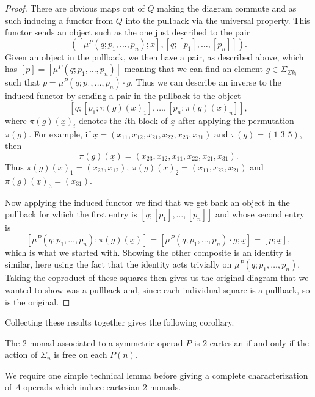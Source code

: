 \begin{proof}
There are obvious maps out of $Q$ making the diagram commute and as such inducing a functor from $Q$ into the pullback via the universal property. This functor sends an object such as the one just described to the pair
    \[
        \left(\left[\mu^P(q;p_1,\ldots,p_n);\underline{x}\right], [q;[p_1],\ldots,[p_n]]\right).
    \]
Given an object in the pullback, we then have a pair, as described above, which has $[p] = [\mu^P(q;p_1,\ldots,p_n)]$ meaning that we can find an element $g \in \Sigma_{\Sigma k_i}$ such that $p  = \mu^P(q;p_1,\ldots,p_n) \cdot g$. Thus we can describe an inverse to the induced functor by sending a pair in the pullback to the object
    \[
        [q;[p_1;\pi(g)(\underline{x})_1],\ldots,[p_n;\pi(g)(\underline{x})_n]],
    \]
where $\pi(g)(\underline{x})_i$ denotes the $i$th block of $\underline{x}$ after applying the permutation $\pi(g)$. For example, if $\underline{x} = (x_{11}, x_{12}, x_{21}, x_{22}, x_{23}, x_{31})$ and $\pi(g) = (1\, \, 3 \, \, 5)$, then
    \[
        \pi(g)(\underline{x}) = (x_{23}, x_{12}, x_{11}, x_{22}, x_{21}, x_{31}).
    \]
Thus $\pi(g)(\underline{x})_1 = (x_{23}, x_{12})$, $\pi(g)(\underline{x})_2 = (x_{11}, x_{22}, x_{21})$ and $\pi(g)(\underline{x})_3 = (x_{31})$.

Now applying the induced functor we find that we get back an object in the pullback for which the first entry is $[q;[p_1],\ldots,[p_n]]$ and whose second entry is
    \[
       \left[\mu^P(q;p_1,\ldots,p_n);\pi(g)(\underline{x})\right] = \left[\mu^P(q;p_1,\ldots,p_n) \cdot g;\underline{x}\right] = [p;\underline{x}],
    \]
which is what we started with. Showing the other composite is an identity is similar, here using the fact that the identity acts trivially on $\mu^P(q;p_1,\ldots,p_n)$. Taking the coproduct of these squares then gives us the original diagram that we wanted to show was a pullback and, since each individual square is a pullback, so is the original.
\end{proof}

Collecting these results together gives the following corollary.

\begin{cor}\label{cart_cor}
The $2$-monad associated to a symmetric operad $P$ is $2$-cartesian if and only if the action of $\Sigma_n$ is free on each $P(n)$.
\end{cor}

We require one simple technical lemma before giving a complete characterization of $\Lambda$-operads which induce cartesian $2$-monads.

